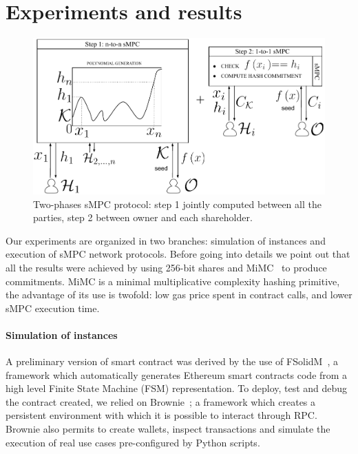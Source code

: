 \section{Experiments and results}\label{sect:evaluation}

\begin{figure}[t]
	\centering
	\includegraphics[width=0.8\columnwidth]{fig/mpc_rev_2}

	\caption{Two-phases sMPC protocol: step 1 jointly computed between all the parties, step 2 between owner and each shareholder.}\vspace*{-2pt}
	\label{fig:mpc2}%
\end{figure}

Our experiments are organized in two branches: simulation of \shortname instances and execution of sMPC network protocols. 
Before going into details we point out that all the results were achieved by using 256-bit shares and MiMC~\cite{albrecht2016mimc} to produce commitments. 
MiMC is a minimal multiplicative complexity hashing primitive, the advantage of its use is twofold: low gas price spent in contract calls, and lower sMPC execution time.

\medskip

\paragraph*{Simulation of \shortname instances}
A preliminary version of \shortname smart contract was derived by the use of FSolidM~\cite{Mavridou2017DesigningSE}, a framework which automatically generates Ethereum smart contracts code from a high level Finite State Machine (FSM) representation.
To deploy, test and debug the contract created, we relied on Brownie~\cite{brownie}; a framework which creates a persistent environment with which it is possible to interact through RPC. 
Brownie also permits to create wallets, inspect transactions and simulate the execution of real use cases pre-configured by Python scripts.

